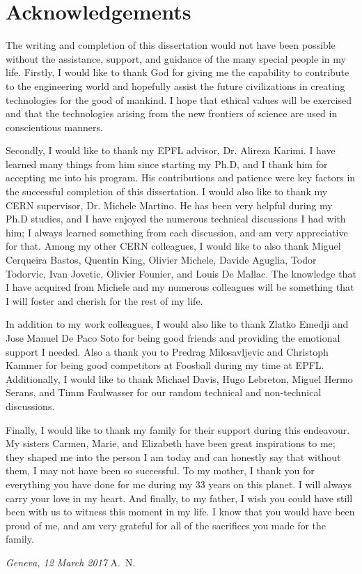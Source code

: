 \chapter*{Acknowledgements}

The writing and completion of this dissertation would not have been possible without the assistance, support, and guidance of the many special people in my life. Firstly, I would like to thank God for giving me the capability to contribute to the engineering world and hopefully assist the future civilizations in creating technologies for the good of mankind. I hope that ethical values will be exercised and that the technologies arising from the new frontiers of science are used in conscientious manners.

Secondly, I would like to thank my EPFL advisor, Dr. Alireza Karimi. 
I have learned many things from him since starting my Ph.D, and I thank him for accepting me into his program. His contributions and patience were key factors in the successful completion of this dissertation.
I would also like to thank my CERN supervisor, Dr. Michele Martino. 
He has been very helpful during my Ph.D studies, and I have enjoyed the numerous technical discussions I had with him; I always learned something from each discussion, and am very appreciative for that. 
Among my other CERN colleagues, I would like to also thank Miguel Cerqueira Bastos, Quentin King, Olivier Michele, Davide Aguglia, Todor Todorvic, Ivan Jovetic, Olivier Founier, and Louis De Mallac. 
The knowledge that I have acquired from Michele and my numerous colleagues will be something that I will foster and cherish for the rest of my life.

In addition to my work colleagues, I would also like to thank Zlatko Emedji and Jose Manuel De Paco Soto for being good friends and providing the emotional support I needed. Also a thank you to Predrag Milosavljevic and Christoph Kammer for being good competitors at Foosball during my time at EPFL. Additionally, I would like to thank Michael Davis, Hugo Lebreton, Miguel Hermo Serans, and Timm Faulwasser for our random technical and non-technical discussions. 


Finally, I would like to thank my family for their support during this endeavour. 
My sisters Carmen, Marie, and Elizabeth have been great inspirations to me; they shaped me into the person I am today and can honestly say that without them, I may not have been so successful. 
To my mother, I thank you for everything you have done for me during my 33 years on this planet. 
I will always carry your love in my heart. 
And finally, to my father, I wish you could have still been with us to witness this moment in my life. 
I know that you would have been proud of me, and am very grateful for all of the sacrifices you made for the family.


\bigskip
 
\noindent\textit{Geneva, 12 March 2017}
\hfill A.~N.

